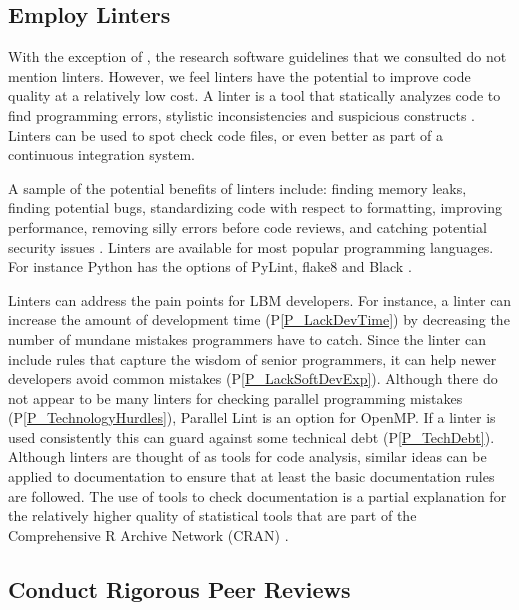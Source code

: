 \documentclass[final, 3p, times, authoryear]{elsarticle}
\newcommand{\ppref}[1]{P\ref{#1}}
\begin{document}
\subsection{Employ Linters} \label{Sec_Linters}

With the exception of \citet{ThielEtAl2020}, the research software guidelines
that we consulted do not mention linters.  However, we feel linters have the
potential to improve code quality at a relatively low cost.  A linter is a tool
that statically analyzes code to find programming errors, stylistic
inconsistencies and suspicious constructs \citep{Wikipedia2022_Lint}. Linters
can be used to spot check code files, or even better as part of a continuous
integration system.  

A sample of the potential benefits of linters include: finding memory leaks,
finding potential bugs, standardizing code with respect to formatting, improving
performance, removing silly errors before code reviews, and catching potential
security issues \citep{SourceLevel2022_Lint}.  Linters are available for most
popular programming languages.  For instance Python has the options of PyLint,
flake8 and Black \citep{Zadka2018}.

Linters can address the pain points for LBM developers.  For instance, a linter
can increase the amount of development time (\ppref{P_LackDevTime}) by
decreasing the number of mundane mistakes programmers have to catch.  Since the
linter can include rules that capture the wisdom of senior programmers, it can
help newer developers avoid common mistakes (\ppref{P_LackSoftDevExp}).  Although
there do not appear to be many linters for checking parallel programming
mistakes (\ppref{P_TechnologyHurdles}), Parallel Lint is an option for OpenMP.
If a linter is used consistently this can guard against some technical debt
(\ppref{P_TechDebt}). Although linters are thought of as tools for code
analysis, similar ideas can be applied to documentation to ensure that at least
the basic documentation rules are followed.  The use of tools to check
documentation is a partial explanation for the relatively higher quality of
statistical tools that are part of the Comprehensive R Archive Network (CRAN)
\citep{SmithEtAl2018_StatSoft}.

\subsection{Conduct Rigorous Peer Reviews}
\end{document}

